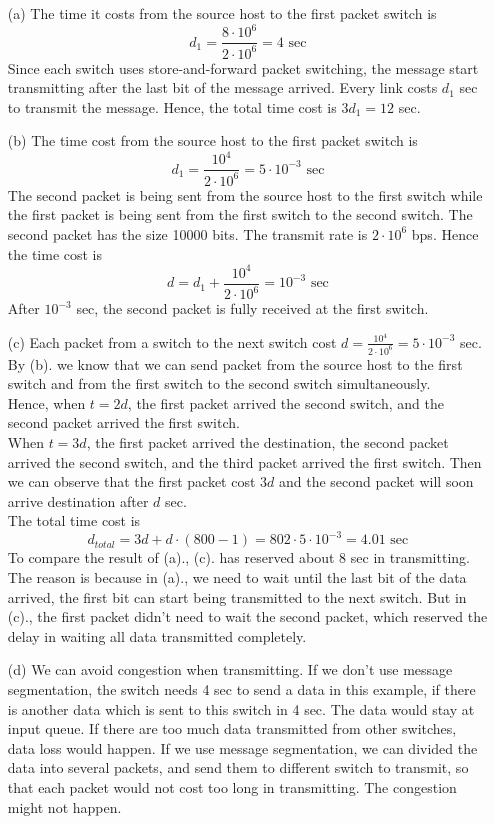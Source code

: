 \documentclass[12pt,a4paper]{article}
\begin{document}
\begin{enumerate}
    \item [(a)] 
        The time it costs from the source host to the first packet switch is
        \[
            d_{1} = \frac{8\cdot 10^{6}}{2\cdot 10^{6}} = 4 \text{ sec}
        \]
        Since each switch uses store-and-forward packet switching, the message start transmitting after the last bit of the message arrived.
        Every link costs $d_{1}$ sec to transmit the message.
        Hence, the total time cost is $3d_{1} = 12$ sec.
    \item[(b)]
        The time cost from the source host to the first packet switch is 
        \[
            d_{1} = \frac{10^{4}}{2\cdot 10^{6}} = 5\cdot 10^{-3} \text{ sec}
        \]
        The second packet is being sent from the source host to the first switch while the first packet is being sent from the first switch to the second switch.
        The second packet has the size 10000 bits. The transmit rate is $2\cdot 10^{6}$ bps.
        Hence the time cost is
        \[
            d = d_{1} + \frac{10^{4}}{2\cdot 10^{6}} = 10^{-3} \text{ sec}
        \]
        After $10^{-3}$ sec, the second packet is fully received at the first switch.
    \item[(c)]
        Each packet from a switch to the next switch cost $d = \frac{10^{4}}{2\cdot 10^{6}} = 5\cdot 10^{-3}$ sec.
        By (b). we know that we can send packet from the source host to the first switch and from the first switch to the second switch simultaneously.
        \\
        Hence, when $t = 2d$, the first packet arrived the second switch, and the second packet arrived the first switch.
        \\
        When $t = 3d$, the first packet arrived the destination, the second packet arrived the second switch, and the third packet arrived the first switch.
        Then we can observe that the first packet cost $3d$ and the second packet will soon arrive destination after $d$ sec.
        \\
        The total time cost is 
        \[
            d_{total} = 3d + d\cdot(800-1) = 802\cdot 5\cdot 10^{-3} = 4.01 \text{ sec}
        \]
        To compare the result of (a)., (c). has reserved about 8 sec in transmitting. The reason is because in (a)., we need to wait until the last bit of the data arrived, the first bit can start being transmitted to the next switch.
        But in (c)., the first packet didn't need to wait the second packet, which reserved the delay in waiting all data transmitted completely.
    \item[(d)]
        We can avoid congestion when transmitting. If we don't use message segmentation, the switch needs 4 sec to send a data in this example, if there is another data which is sent to this switch in 4 sec. The data would stay at input queue.
        If there are too much data transmitted from other switches, data loss would happen. If we use message segmentation, we can divided the data into several packets, and send them to different switch to transmit, so that each packet would not cost too long in transmitting.
        The congestion might not happen.

\end{enumerate}
\end{document}
